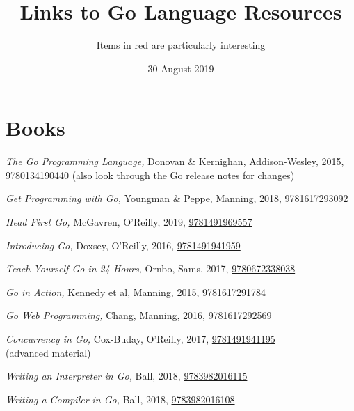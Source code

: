 \documentclass[12pt,notitlepage]{article}
\begin{document}
\title{Links to Go Language Resources}
\author{Items in {\color{red} red} are particularly interesting}
\date{30 August 2019}
\maketitle
\thispagestyle{empty}

\section{Books}

{\em The Go Programming Language,} Donovan \& Kernighan, Addison-Wesley, 2015,\\%
\href{https://www.amazon.com/Programming-Language-Addison-Wesley-Professional-Computing/dp/0134190440}{9780134190440}
(also look through the \href{https://golang.org/doc/devel/release.html}{Go release notes} for changes)

{\em Get Programming with Go,} Youngman \& Peppe, Manning, 2018, 
\href{https://www.amazon.com/Get-Programming-Go-Nathan-Youngman/dp/1617293091}{9781617293092}

{\em Head First Go,} McGavren, O'Reilly, 2019, 
\href{https://www.amazon.com/Head-First-Go-Jay-McGavren/dp/1491969555}{9781491969557}

{\em Introducing Go,} Doxsey, O'Reilly, 2016, 
\href{https://www.amazon.com/Introducing-Go-Reliable-Scalable-Programs/dp/1491941952}{9781491941959}

{\em Teach Yourself Go in 24 Hours,} Ornbo, Sams, 2017, 
\href{https://www.amazon.com/Sams-Teach-Yourself-Hours-Programming/dp/0672338033}{9780672338038}

{\em Go in Action,} Kennedy et al, Manning, 2015, 
\href{https://www.amazon.com/Go-Action-William-Kennedy/dp/1617291781}{9781617291784}

{\em Go Web Programming,} Chang, Manning, 2016, 
\href{https://www.amazon.com/Web-Programming-Sau-Sheong-Chang/dp/1617292567}{9781617292569}

{\em Concurrency in Go,} Cox-Buday, O'Reilly, 2017, 
\href{https://www.amazon.com/Programming-Language-Addison-Wesley-Professional-Computing/dp/0134190440}{9781491941195}
\\(advanced material)

{\em Writing an Interpreter in Go,} Ball, 2018, 
\href{https://www.amazon.com/Writing-Interpreter-Go-Thorsten-Ball/dp/3982016118}{9783982016115}

{\em Writing a Compiler in Go,} Ball, 2018, 
\href{https://www.amazon.com/Writing-Compiler-Go-Thorsten-Ball/dp/398201610X}{9783982016108}
\end{document}
